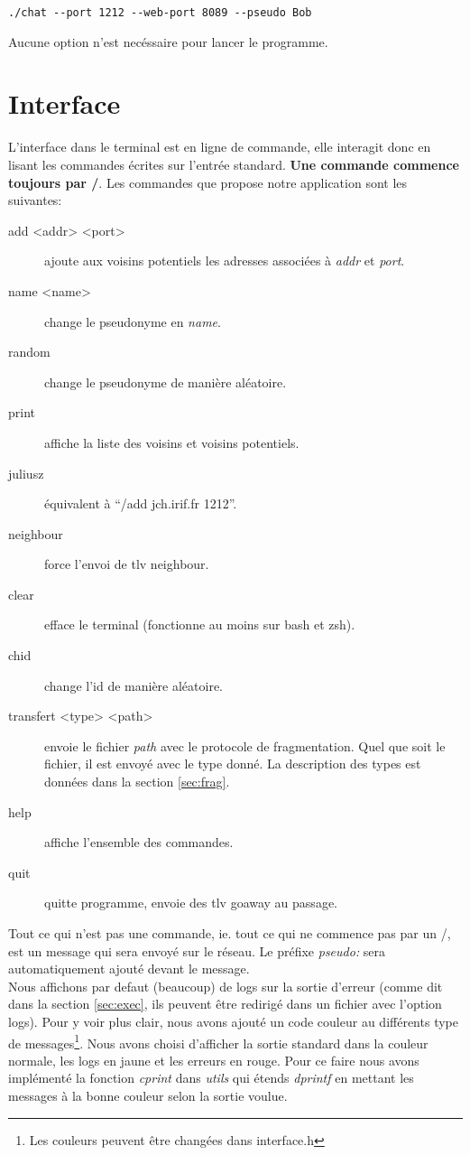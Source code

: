 \documentclass[a4paper,10pt]{article} %
\begin{document}
\begin{verbatim}
./chat --port 1212 --web-port 8089 --pseudo Bob
\end{verbatim}

Aucune option n'est necéssaire pour lancer le programme.

\section{Interface}

L'interface dans le terminal est en ligne de commande, elle interagit donc en lisant les commandes écrites sur l'entrée standard. \textbf{Une commande commence toujours par /}. Les commandes que propose notre application sont les suivantes:
\begin{description}
\item[add <addr> <port>] ajoute aux voisins potentiels les adresses associées à \textit{addr} et \textit{port}.
\item[name <name>] change le pseudonyme en \textit{name}.
\item[random] change le pseudonyme de manière aléatoire.
\item[print] affiche la liste des voisins et voisins potentiels.
\item[juliusz] équivalent à ``/add jch.irif.fr 1212''.
\item[neighbour] force l'envoi de tlv neighbour.
\item[clear] efface le terminal (fonctionne au moins sur bash et zsh).
\item[chid] change l'id de manière aléatoire.
\item[transfert <type> <path>] envoie le fichier \textit{path} avec le protocole de fragmentation. Quel que soit le fichier, il est envoyé avec le type donné. La description des types est données dans la section \ref{sec:frag}.
\item[help] affiche l'ensemble des commandes.
\item[quit] quitte programme, envoie des tlv goaway au passage.
\end{description}

Tout ce qui n'est pas une commande, ie. tout ce qui ne commence pas par un \textrm{/}, est un message qui sera envoyé sur le réseau. Le préfixe \textit{pseudo: } sera automatiquement ajouté devant le message.\\

Nous affichons par defaut (beaucoup) de logs sur la sortie d'erreur (comme dit dans la section \ref{sec:exec}, ils peuvent être redirigé dans un fichier avec l'option \textrm{logs}). Pour y voir plus clair, nous avons ajouté un code couleur au différents type de messages\footnote{Les couleurs peuvent être changées dans \textrm{interface.h}}. Nous avons choisi d'afficher la sortie standard dans la couleur normale, les logs en jaune et les erreurs en rouge. Pour ce faire nous avons implémenté la fonction \textit{cprint} dans \textit{utils} qui étends \textit{dprintf} en mettant les messages à la bonne couleur selon la sortie voulue.\\
\end{document}
